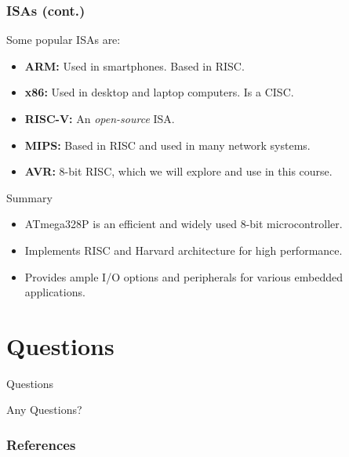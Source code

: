 \documentclass[aspectratio=169]{beamer}
\begin{document}
\begin{frame}
  \frametitle{ISAs (cont.)}
  Some popular ISAs are: \pause
  \begin{itemize}
    \item <2-> \textbf{ARM:} Used in smartphones. Based in RISC.
    \item <3-> \textbf{x86:} Used in desktop and laptop computers. Is a CISC.
    \item <4-> \textbf{RISC-V:} An \textit{open-source} ISA.
    \item <5-> \textbf{MIPS:} Based in RISC and used in many network systems.
    \item <6-> \textbf{AVR:} 8-bit RISC, which we will explore and use in this course.
  \end{itemize}
\end{frame}

\begin{frame}{Summary}
    \begin{itemize}
        \item ATmega328P is an efficient and widely used 8-bit microcontroller.
        \item Implements RISC and Harvard architecture for high performance.
        \item Provides ample I/O options and peripherals for various embedded applications.
    \end{itemize}
\end{frame}

\section{Questions}
\begin{frame}{Questions}
    \begin{center}
        \Huge{Any Questions?}
    \end{center}
\end{frame}

\begin{frame}
    \frametitle{References}
    \printbibliography
\end{frame}
\end{document}
